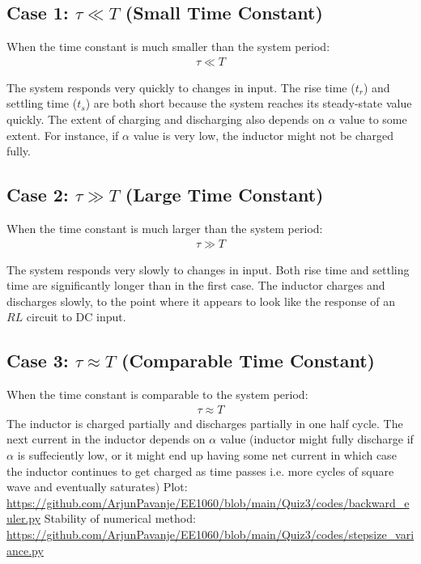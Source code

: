 \documentclass{article}
\begin{document}
\subsection*{Case 1: $\tau \ll T$ (Small Time Constant)}

When the time constant is much smaller than the system period:
\begin{align*}
\tau \ll T
\end{align*}

The system responds very quickly to changes in input. The rise time ($t_r$) and settling time ($t_s$) are both short because the system reaches its steady-state value quickly. The extent of charging and discharging also depends on $\alpha$ value to some extent. For instance, if $\alpha$ value is very low, the inductor might not be charged fully.

\subsection*{Case 2: $\tau \gg T$ (Large Time Constant)}

When the time constant is much larger than the system period:
\begin{align*}
\tau \gg T
\end{align*}

The system responds very slowly to changes in input. Both rise time and settling time are significantly longer than in the first case. The inductor charges and discharges slowly, to the point where it appears to look like the response of an $RL$ circuit to DC input.

\subsection*{Case 3: $\tau \approx T$ (Comparable Time Constant)}

When the time constant is comparable to the system period:
\begin{align*}
\tau \approx T
\end{align*}
The inductor is charged partially and discharges partially in one half cycle. The next current in the inductor depends on $\alpha$ value (inductor might fully discharge if $ \alpha$ is suffeciently low, or it might end up having some net current in which case the inductor continues to get charged as time passes i.e. more cycles of square wave and eventually saturates) \newline \newline
Plot:\newline
\url{https://github.com/ArjunPavanje/EE1060/blob/main/Quiz3/codes/backward_euler.py}\newline
Stability of numerical method: \newline
\url{https://github.com/ArjunPavanje/EE1060/blob/main/Quiz3/codes/stepsize_variance.py} \newline
\end{document}
